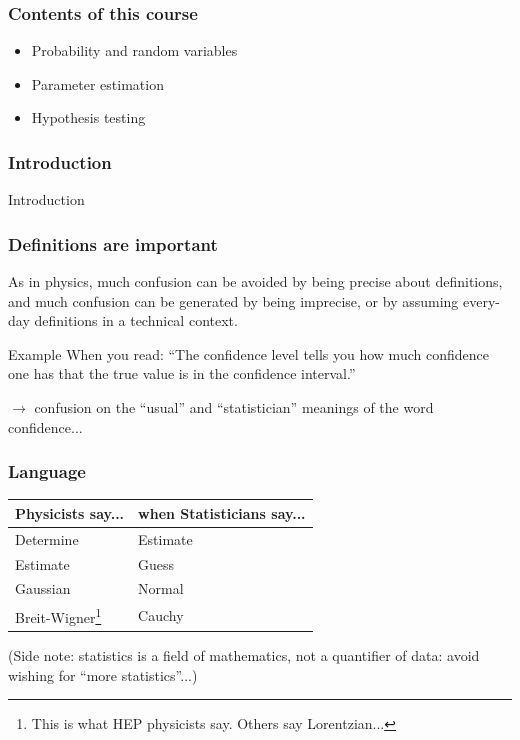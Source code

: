 \documentclass[9pt]{beamer}
\begin{document}
\begin{frame}
 \frametitle{Contents of this course}
 
 \begin{itemize}
  \item Probability and random variables
  \item Parameter estimation
  \item Hypothesis testing
 \end{itemize}

\end{frame}

\begin{frame}
 \frametitle{Introduction}
 
 Introduction
\end{frame}

\begin{frame}
 \frametitle{Definitions are important}

 As in physics, much confusion can be avoided by being
precise about definitions, and much confusion can be
generated by being imprecise, or by assuming every-day
definitions in a technical context.

\begin{exampleblock}{Example}
 When you read: ``The confidence level tells you how much confidence one
has that the true value is in the confidence interval.''

$\to$ confusion on the ``usual'' and ``statistician'' meanings of the word confidence...

\end{exampleblock}

\end{frame}


\begin{frame}
 \frametitle{Language}
 
 \begin{center}
 \begin{tabular}{ll}
  Physicists say... & when Statisticians say... \\
  \hline
  Determine & Estimate \\
  Estimate & Guess \\
  Gaussian & Normal \\
  Breit-Wigner\footnote{This is what HEP physicists say. Others say Lorentzian...} & Cauchy \\
 \end{tabular}
 \end{center}
 
 (Side note: statistics is a field of mathematics, not a quantifier of data: avoid wishing for ``more statistics''...)
 

\end{frame}
\end{document}
